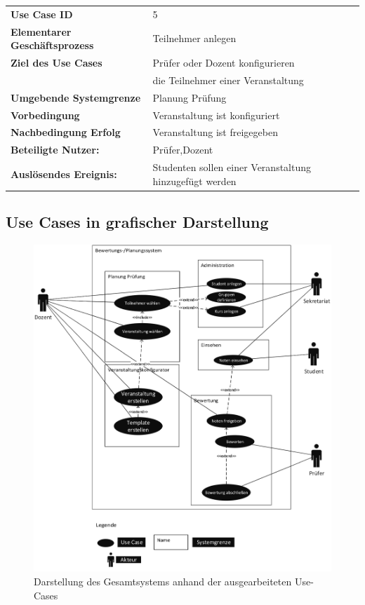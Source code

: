 			\begin{table}[H]
			\begin{tabular}{ll}
			 \textbf{Use Case ID} & 5 \\
		 	 \textbf{Elementarer Geschäftsprozess} &  Teilnehmer anlegen \\ 
			 \textbf{Ziel des Use Cases} & Prüfer oder Dozent konfigurieren \\& die Teilnehmer einer Veranstaltung  \\
			 \textbf{Umgebende Systemgrenze} & Planung Prüfung \\ 
			 \textbf{Vorbedingung} & Veranstaltung ist konfiguriert \\
			 \textbf{Nachbedingung Erfolg} & Veranstaltung ist freigegeben\\
			 			    
			 \textbf{Beteiligte Nutzer:} & Prüfer,Dozent \\ 
		     \textbf{Auslösendes Ereignis:} & Studenten sollen einer Veranstaltung hinzugefügt werden\\ 
			 
			\end{tabular} 
			\label{tab:usecase_5}
			\end{table}

						
		\clearpage
		\subsection{Use Cases in grafischer Darstellung}
		
	\begin{figure}[th!]
	\centering
	\includegraphics[width=\textwidth]{./img/use_case}
	\caption{Darstellung des Gesamtsystems anhand der ausgearbeiteten Use-Cases}
	\label{fig:use_case}
	\end{figure}
	\newpage
	
